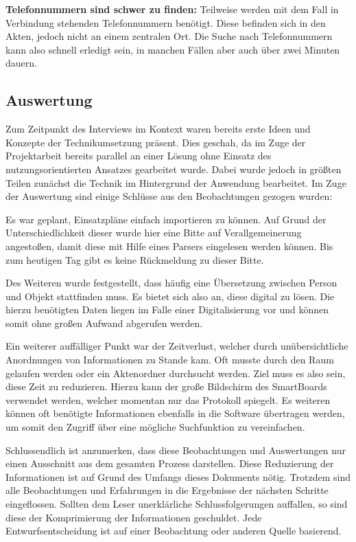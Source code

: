 \textbf{Telefonnummern sind schwer zu finden:} Teilweise werden mit dem Fall in Verbindung stehenden Telefonnummern benötigt.
Diese befinden sich in den Akten, jedoch nicht an einem zentralen Ort.
Die Suche nach Telefonnummern kann also schnell erledigt sein, in manchen Fällen aber auch über zwei Minuten dauern.

\subsection{Auswertung}

Zum Zeitpunkt des Interviews im Kontext waren bereits erste Ideen und Konzepte der Technikumsetzung präsent.
Dies geschah, da im Zuge der Projektarbeit bereits parallel an einer Lösung ohne Einsatz des nutzungsorientierten Ansatzes gearbeitet wurde.
Dabei wurde jedoch in größten Teilen zunächst die Technik im Hintergrund der Anwendung bearbeitet.
Im Zuge der Auswertung sind einige Schlüsse aus den Beobachtungen gezogen wurden:

Es war geplant, Einsatzpläne einfach importieren zu können.
Auf Grund der Unterschiedlichkeit dieser wurde hier eine Bitte auf Verallgemeinerung angestoßen, damit diese mit Hilfe eines Parsers eingelesen werden können.
Bis zum heutigen Tag gibt es keine Rückmeldung zu dieser Bitte.

Des Weiteren wurde festgestellt, dass häufig eine Übersetzung zwischen Person und Objekt stattfinden muss.
Es bietet sich also an, diese digital zu lösen.
Die hierzu benötigten Daten liegen im Falle einer Digitalisierung vor und können somit ohne großen Aufwand abgerufen werden.

Ein weiterer auffälliger Punkt war der Zeitverlust, welcher durch unübersichtliche Anordnungen von Informationen zu Stande kam.
Oft musste durch den Raum gelaufen werden oder ein Aktenordner durchsucht werden.
Ziel muss es also sein, diese Zeit zu reduzieren.
Hierzu kann der große Bildschirm des SmartBoards verwendet werden, welcher momentan nur das Protokoll spiegelt.
Es weiteren können oft benötigte Informationen ebenfalls in die Software übertragen werden, um somit den Zugriff über eine mögliche Suchfunktion zu vereinfachen.

Schlussendlich ist anzumerken, dass diese Beobachtungen und Auswertungen nur einen Ausschnitt aus dem gesamten Prozess darstellen.
Diese Reduzierung der Informationen ist auf Grund des Umfangs dieses Dokuments nötig.
Trotzdem sind alle Beobachtungen und Erfahrungen in die Ergebnisse der nächsten Schritte eingeflossen.
Sollten dem Leser unerklärliche Schlussfolgerungen auffallen, so sind diese der Komprimierung der Informationen geschuldet.
Jede Entwurfsentscheidung ist auf einer Beobachtung oder anderen Quelle basierend.